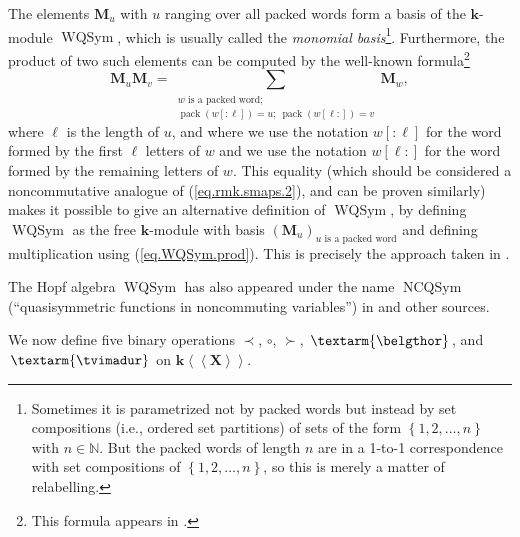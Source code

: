 \documentclass
[numbers=enddot,12pt,final,onecolumn,notitlepage,abstracton]{scrartcl}%
\theoremstyle{definition}
\newcommand{\tvi}{\left. \textarm{\tvimadur} \right.}
\newcommand{\bel}{\left. \textarm{\belgthor} \right.}
\let\sumnonlimits\sum
\renewcommand{\sum}{\sumnonlimits\limits}
\begin{document}
The elements $\mathbf{M}_{u}$ with $u$ ranging over all packed words form a
basis of the $\mathbf{k}$-module $\operatorname*{WQSym}$, which is usually
called the \textit{monomial basis}\footnote{Sometimes it is parametrized not
by packed words but instead by set compositions (i.e., ordered set partitions)
of sets of the form $\left\{  1,2,\ldots,n\right\}  $ with $n\in\mathbb{N}$.
But the packed words of length $n$ are in a 1-to-1 correspondence with set
compositions of $\left\{  1,2,\ldots,n\right\}  $, so this is merely a matter
of relabelling.}. Furthermore, the product of two such elements can be
computed by the well-known formula\footnote{This formula appears in
\cite[Proposition 4.1]{MNT}.}%
\begin{equation}
\mathbf{M}_{u}\mathbf{M}_{v}=\sum_{\substack{w\text{ is a packed
word;}\\\operatorname*{pack}\left(  w\left[  :\ell\right]  \right)
=u;\ \operatorname*{pack}\left(  w\left[  \ell:\right]  \right)
=v}}\mathbf{M}_{w}, \label{eq.WQSym.prod}%
\end{equation}
where $\ell$ is the length of $u$, and where we use the notation $w\left[
:\ell\right]  $ for the word formed by the first $\ell$ letters of $w$ and we
use the notation $w\left[  \ell:\right]  $ for the word formed by the
remaining letters of $w$. This equality (which should be considered a
noncommutative analogue of (\ref{eq.rmk.smaps.2}), and can be proven
similarly) makes it possible to give an alternative definition of
$\operatorname*{WQSym}$, by defining $\operatorname*{WQSym}$ as the free
$\mathbf{k}$-module with basis $\left(  \mathbf{M}_{u}\right)  _{u\text{ is a
packed word}}$ and defining multiplication using (\ref{eq.WQSym.prod}). This
is precisely the approach taken in \cite[Section 1.1]{FM}.

The Hopf algebra $\operatorname*{WQSym}$ has also appeared under the name
$\operatorname*{NCQSym}$ (\textquotedblleft quasisymmetric functions in
noncommuting variables\textquotedblright) in \cite[Section 5.2]{BerZab} and
other sources.

We now define five binary operations $\left.  \prec\right.  $, $\circ$,
$\left.  \succ\right.  $, $\bel $, and $\tvi $ on $\mathbf{k}\left\langle
\left\langle \mathbf{X}\right\rangle \right\rangle $.
\end{document}
